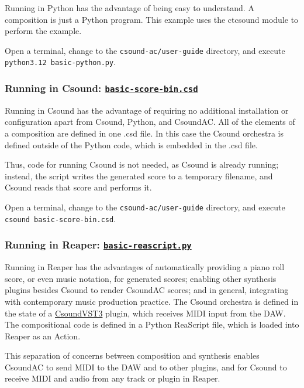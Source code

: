 \documentclass[letterpaper,10pt,DIV=12,parskip=half]{scrartcl}
\begin{document}
Running in Python has the advantage of being easy to understand. A composition is just a Python program. This example uses the ctcsound module to perform the example.

Open a terminal, change to the \lstinline|csound-ac/user-guide| directory, and execute \lstinline|python3.12 basic-python.py|.

\subsubsection{Running in Csound: \href{https://github.com/gogins/csound-ac/blob/master/user-guide/basic-score-bin.csd}{\lstinline|basic-score-bin.csd|}}

Running in Csound has the advantage of requiring no additional installation or configuration apart from Csound, Python, and CsoundAC. All of the elements of a composition are defined in one .csd file. In this case the Csound orchestra is defined outside of the Python code, which is embedded in the .csd file.

Thus, code for running Csound is not needed, as Csound is already running; instead, the script writes the generated score to a temporary filename, and Csound reads that score and performs it. 

Open a terminal, change to the \lstinline|csound-ac/user-guide| directory, and execute \lstinline|csound basic-score-bin.csd|.

\subsubsection{Running in Reaper: \href{https://github.com/gogins/csound-ac/blob/master/user-guide/basic-reascript.py}{\lstinline|basic-reascript.py|}}

Running in Reaper has the advantages of automatically providing a piano roll score, or even music notation, for generated scores; enabling other synthesis plugins besides Csound to render CsoundAC scores; and in general, integrating with contemporary music production practice. The Csound orchestra is defined in the state of a \href{https://github.com/gogins/csound-vst3}{CsoundVST3} plugin, which receives MIDI input from the DAW. The compositional code is defined in a Python ReaScript file, which is loaded into Reaper as an Action. 

This separation of concerns between composition and synthesis enables CsoundAC to send MIDI to the DAW and to other plugins, and for Csound to receive MIDI and audio from any track or plugin in Reaper.
\end{document}
